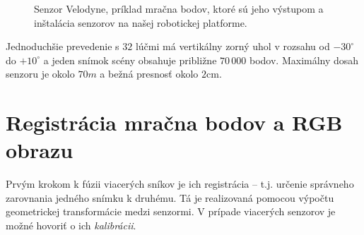 \documentclass[12pt, a4paper]{article}
\begin{document}
\begin{figure}[h]
\center
	\quad
	\quad
\caption{Senzor Velodyne, príklad mračna bodov, ktoré sú jeho výstupom a inštalácia senzorov na našej robotickej platforme.\cite{velodyne}\label{fig:velodyne}}
\end{figure}

Jednoduchšie prevedenie s $32$ lúčmi má vertikálny zorný uhol v rozsahu od $-30^{\circ}$ do $+10^{\circ}$ a jeden snímok scény obsahuje približne $70\,000$ bodov. Maximálny dosah senzoru je okolo $70m$ a bežná presnosť okolo $2$cm.

\section{Registrácia mračna bodov a RGB obrazu}
Prvým krokom k fúzii viacerých sníkov je ich registrácia -- t.j. určenie správneho zarovnania jedného snímku k druhému\cite{jan}. Tá je realizovaná pomocou výpočtu geometrickej transformácie medzi senzormi. V prípade viacerých senzorov je možné hovoriť o ich \emph{kalibrácii}.
\end{document}
